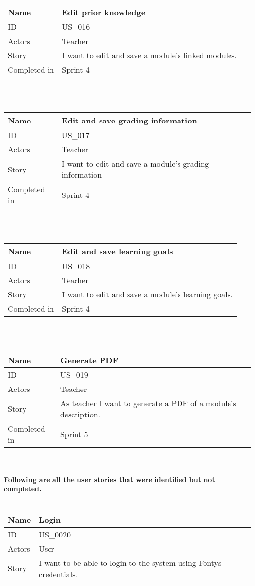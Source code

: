 \documentclass[12pt, a4paper]{article}
\newcommand\addrow[2]{#1 &#2\\ }
\newcommand\tabularhead{\begin{tabular}{lp{8cm}}
		\hline
	}
\newenvironment{usecase}{\tabularhead}
	{\hline\end{tabular}}
\begin{document}
	    \begin{usecase}
		\addrow{Name}{Edit prior knowledge}
		\hline
		\addrow{ID}{US\_016}
		\hline
		\addrow{Actors}{ Teacher }
		\hline		
		\addrow{Story}{I want to edit and save a module's linked modules.}
		\hline
		\addrow{Completed in}{Sprint 4}
	\end{usecase}
	
	~\\
	~\\
	
	    \begin{usecase}
		\addrow{Name}{Edit and save grading information}
		\hline
		\addrow{ID}{US\_017}
		\hline
		\addrow{Actors}{ Teacher }
		\hline		
		\addrow{Story}{I want to edit and save a module's grading information}
		\hline
		\addrow{Completed in}{Sprint 4}
	\end{usecase}
	
	~\\
	~\\
	
	    \begin{usecase}
		\addrow{Name}{Edit and save learning goals}
		\hline
		\addrow{ID}{US\_018}
		\hline
		\addrow{Actors}{ Teacher }
		\hline		
		\addrow{Story}{I want to edit and save a module's learning goals.}
		\hline
		\addrow{Completed in}{Sprint 4}
	\end{usecase}

	
	~\\
	~\\
	
		    \begin{usecase}
		\addrow{Name}{Generate PDF}
		\hline
		\addrow{ID}{US\_019}
		\hline
		\addrow{Actors}{ Teacher }
		\hline		
		\addrow{Story}{As teacher I want to generate a PDF of a module's description.}
		\hline
		\addrow{Completed in}{Sprint 5}
	\end{usecase}

	~\\
	~\\
	
	\textbf{Following are all the user stories that were identified but not completed.} ~\\ ~\\
	
	\begin{usecase}
	\addrow{Name}{Login}
	\hline
	\addrow{ID}{US\_0020}
	\hline
	\addrow{Actors}{ User }
	\hline		
	\addrow{Story}{I want to be able to login to the system using Fontys credentials.}
\end{usecase}
\end{document}
